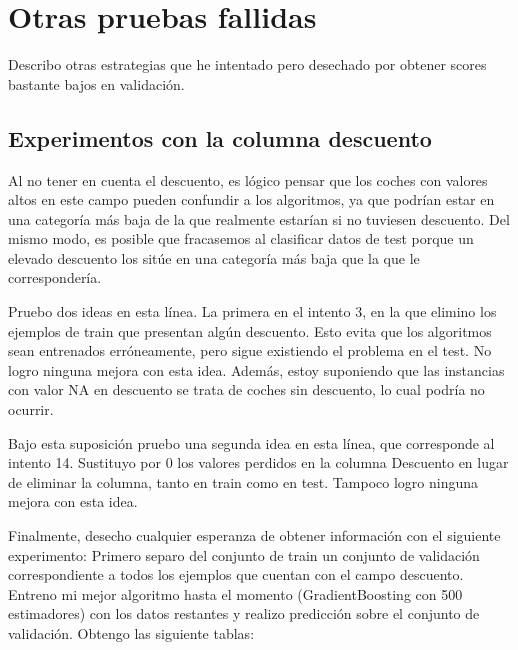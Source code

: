 \documentclass{article}
\begin{document}
\section{Otras pruebas fallidas}

Describo otras estrategias que he intentado pero desechado por obtener
scores bastante bajos en validación.

\subsection{Experimentos con la columna descuento} \label{descuento}

Al no tener en cuenta el descuento, es lógico pensar que los coches
con valores altos en este campo pueden confundir a los algoritmos, ya
que podrían estar en una categoría más baja de la que realmente
estarían si no tuviesen descuento. Del mismo modo, es posible que
fracasemos al clasificar datos de test porque un elevado descuento los
sitúe en una categoría más baja que la que le correspondería.

Pruebo dos ideas en esta línea. La primera en el intento 3, en la que
elimino los ejemplos de train que presentan algún descuento. Esto
evita que los algoritmos sean entrenados erróneamente, pero sigue
existiendo el problema en el test. No logro ninguna mejora con esta
idea. Además, estoy suponiendo que las instancias con valor NA en
descuento se trata de coches sin descuento, lo cual podría no ocurrir.

Bajo esta suposición pruebo una segunda idea en esta línea, que
corresponde al intento 14. Sustituyo por 0 los valores perdidos en la
columna Descuento en lugar de eliminar la columna, tanto en train como
en test. Tampoco logro ninguna mejora con esta idea.

Finalmente, desecho cualquier esperanza de obtener información con el
siguiente experimento: Primero separo del conjunto de train un
conjunto de validación correspondiente a todos los ejemplos que
cuentan con el campo descuento. Entreno mi mejor algoritmo hasta el
momento (GradientBoosting con 500 estimadores) con los datos restantes
y realizo predicción sobre el conjunto de validación. Obtengo las
siguiente tablas:
\end{document}
